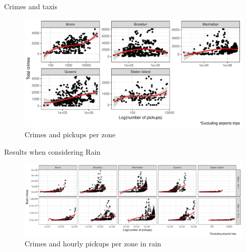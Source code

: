 \documentclass[10pt,ignorenonframetext,]{beamer}
\begin{document}
\begin{frame}
\end{frame}

\begin{frame}

\begin{block}{Crimes and taxis}

\begin{figure} 
\centering
\includegraphics[width=1\textwidth]{../img/scatter_crimes_taxis_pres.pdf}
\caption{Crimes and pickups per zone}
\end{figure}

\end{block}

\end{frame}

\begin{frame}

\begin{block}{Results when considering Rain}

\begin{figure} 
\centering
\includegraphics[width=1\textwidth]{../img/scatter_crimes_taxis_rain.pdf}
\caption{Crimes and hourly pickups per zone in rain}
\end{figure}

\end{block}

\end{frame}
\end{document}

